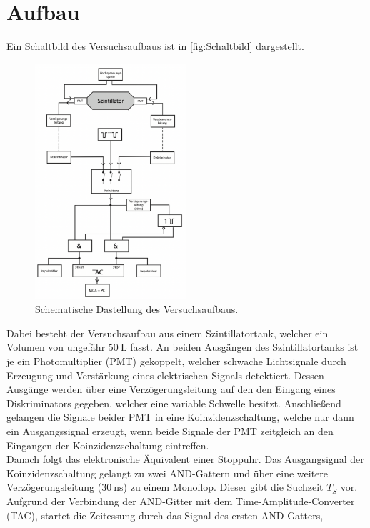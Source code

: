\section{Aufbau}
\label{sec:Aufbau}
Ein Schaltbild des Versuchsaufbaus ist in \autoref{fig:Schaltbild} dargestellt. 
\begin{figure}[H]
    \centering
    \includegraphics[width=0.5\textwidth]{Abbildungen/Schaltung.png}
    \caption {Schematische Dastellung des Versuchsaufbaus.\cite{V01}}
    \label{fig:Schaltbild}
\end{figure}
Dabei besteht der Versuchsaufbau aus einem Szintillatortank, welcher ein Volumen von ungefähr $\qty{50}{\liter}$ fasst.
An beiden Ausgängen des Szintillatortanks ist je ein Photomultiplier (PMT) gekoppelt, welcher schwache Lichtsignale durch Erzeugung und Verstärkung eines elektrischen Signals detektiert.
Dessen Ausgänge werden über eine Verzögerungsleitung auf den den Eingang eines Diskriminators gegeben, welcher eine variable Schwelle besitzt. 
Anschließend gelangen die Signale beider PMT in eine Koinzidenzschaltung, welche nur dann ein Ausgangssignal erzeugt, wenn beide Signale der PMT zeitgleich an den Eingangen der Koinzidenzschaltung
eintreffen.\\
Danach folgt das elektronische Äquivalent einer Stoppuhr.
Das Ausgangsignal der Koinzidenzschaltung gelangt zu zwei AND-Gattern und über eine weitere Verzögerungsleitung ($\qty{30}{\nano\second}$) zu einem Monoflop. Dieser gibt die Suchzeit $T_S$ vor.
Aufgrund der Verbindung der AND-Gitter mit dem Time-Amplitude-Converter (TAC), startet die Zeitessung durch das Signal des ersten AND-Gatters,
